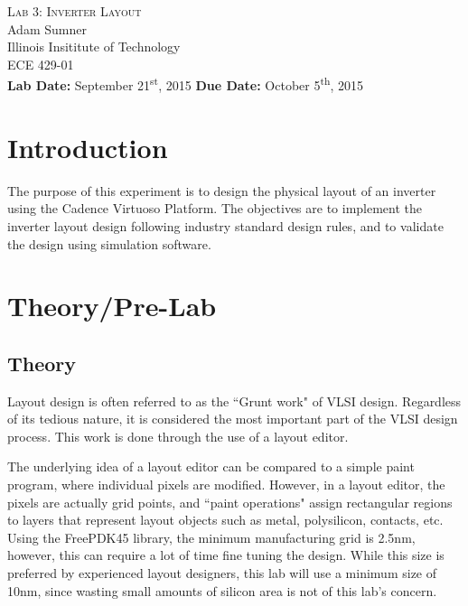 \documentclass[12pt]{article}
\begin{document}
\begin{titlepage}
	\begin{center}
		
		
		\vfill
		
		\textsc{\LARGE Lab 3: Inverter Layout}\\[1.5cm]
		
		\Large Adam Sumner\\[0.5cm]
		
		\Large Illinois Insititute of Technology\\[0.5cm]
		
		\Large ECE 429-01\\[0.5cm]	
		
		\noindent
		\vfill
		\large \textbf{Lab Date:} September 21\textsuperscript{st}, 2015\hfill
		\large \textbf{Due Date:} October 5\textsuperscript{th}, 2015
	
		
	\end{center}
\end{titlepage}

\section{Introduction}
The purpose of this experiment is to design the physical layout of an inverter using the Cadence Virtuoso Platform. The objectives are to implement the inverter layout design following industry standard design rules, and to validate the design using simulation software.
\section{Theory/Pre-Lab}
\subsection{Theory}
Layout design is often referred to as the ``Grunt work" of VLSI design. Regardless of its tedious nature, it is considered the most important part of the VLSI design process. This work is done through the use of a layout editor.

The underlying idea of a layout editor can be compared to a simple paint program, where individual pixels are modified. However, in a layout editor, the pixels are actually grid points, and ``paint operations" assign rectangular regions to layers that represent layout objects such as metal, polysilicon, contacts, etc. Using the FreePDK45 library, the minimum manufacturing grid is 2.5nm, however, this can require a lot of time fine tuning the design. While this size is preferred by experienced layout designers, this lab will use a minimum size of 10nm, since wasting small amounts of silicon area is not of this lab's concern. 
\end{document}
